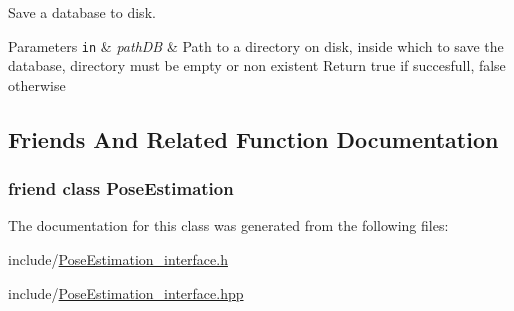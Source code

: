 Save a database to disk. 


\begin{DoxyParams}[1]{Parameters}
\mbox{\tt in}  & {\em path\-D\-B} & Path to a directory on disk, inside which to save the database, directory must be empty or non existent Return true if succesfull, false otherwise \\
\hline
\end{DoxyParams}


\subsection{Friends And Related Function Documentation}
\hypertarget{classPoseDB_acc93828d970ba58835be2e8221c7a669}{
\subsubsection[{Pose\-Estimation}]{\setlength{\rightskip}{0pt plus 5cm}friend class {\bf Pose\-Estimation}\hspace{0.3cm}{\ttfamily [friend]}}}\label{classPoseDB_acc93828d970ba58835be2e8221c7a669}


The documentation for this class was generated from the following files\-:\begin{DoxyCompactItemize}
\item 
include/\hyperlink{PoseEstimation__interface_8h}{Pose\-Estimation\-\_\-interface.\-h}\item 
include/\hyperlink{PoseEstimation__interface_8hpp}{Pose\-Estimation\-\_\-interface.\-hpp}\end{DoxyCompactItemize}
